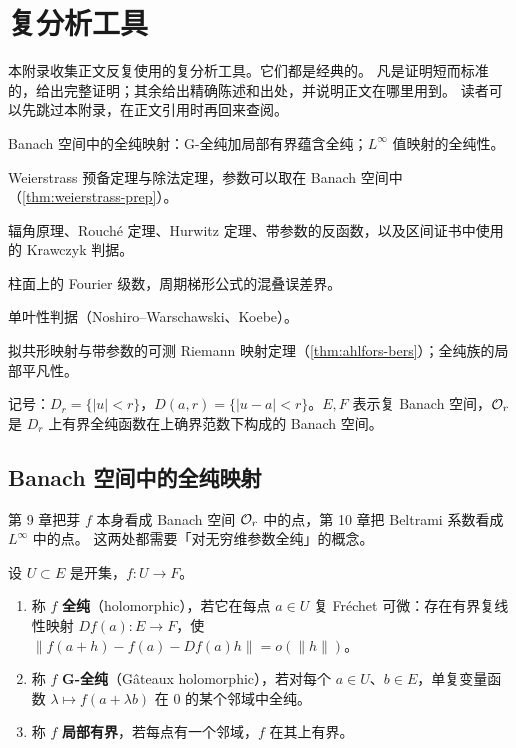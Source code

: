 \chapter{复分析工具}\label{app:tools}

本附录收集正文反复使用的复分析工具。它们都是经典的。
凡是证明短而标准的，给出完整证明；其余给出精确陈述和出处，并说明正文在哪里用到。
读者可以先跳过本附录，在正文引用时再回来查阅。

\begin{goals}
\item Banach 空间中的全纯映射：G-全纯加局部有界蕴含全纯；$L^\infty$ 值映射的全纯性。
\item Weierstrass 预备定理与除法定理，参数可以取在 Banach 空间中（\cref{thm:weierstrass-prep}）。
\item 辐角原理、Rouché 定理、Hurwitz 定理、带参数的反函数，以及区间证书中使用的 Krawczyk 判据。
\item 柱面上的 Fourier 级数，周期梯形公式的混叠误差界。
\item 单叶性判据（Noshiro--Warschawski、Koebe）。
\item 拟共形映射与带参数的可测 Riemann 映射定理（\cref{thm:ahlfors-bers}）；全纯族的局部平凡性。
\end{goals}

记号：$D_r=\{|u|<r\}$，$D(a,r)=\{|u-a|<r\}$。$E,F$ 表示复 Banach 空间，$\mathcal O_r$ 是 $D_r$ 上有界全纯函数在上确界范数下构成的 Banach 空间。

\section{Banach 空间中的全纯映射}\label{appA:sec:banach}

第 9 章把芽 $f$ 本身看成 Banach 空间 $\mathcal O_r$ 中的点，第 10 章把 Beltrami 系数看成 $L^\infty$ 中的点。
这两处都需要「对无穷维参数全纯」的概念。

\begin{definition}\label{appA:def:holomorphic}
设 $U\subset E$ 是开集，$f:U\to F$。
\begin{enumerate}
\item 称 $f$ \textbf{全纯}（holomorphic），若它在每点 $a\in U$ 复 Fréchet 可微：存在有界复线性映射 $Df(a):E\to F$，使 $\|f(a+h)-f(a)-Df(a)h\|=o(\|h\|)$。
\item 称 $f$ \textbf{G-全纯}（Gâteaux holomorphic），若对每个 $a\in U$、$b\in E$，单复变量函数 $\lambda\mapsto f(a+\lambda b)$ 在 $0$ 的某个邻域中全纯。
\item 称 $f$ \textbf{局部有界}，若每点有一个邻域，$f$ 在其上有界。
\end{enumerate}
\end{definition}

